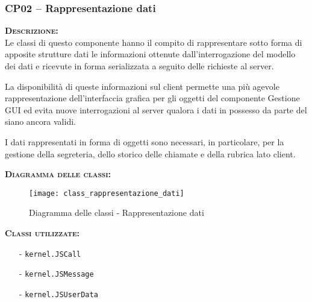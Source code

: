 \subsubsection{CP02 -- Rappresentazione dati}
\begin{description}
  \item{\scshape\bfseries Descrizione:}\\
Le classi di questo componente hanno il compito di rappresentare sotto forma di apposite strutture dati le informazioni ottenute dall'interrogazione del modello dei dati e ricevute in forma serializzata a seguito delle richieste al server.

La disponibilità di queste informazioni sul client permette una più agevole rappresentazione dell'interfaccia grafica per gli oggetti del componente \textsf{Gestione GUI} ed evita nuove interrogazioni al server qualora i dati in possesso da parte del  siano ancora validi.

I dati rappresentati in forma di oggetti sono necessari, in particolare, per la gestione della segreteria, dello storico delle chiamate e della rubrica lato client.

  \item{\scshape\bfseries Diagramma delle classi:}\\
  \begin{figure}[H]
    \centering
    \texttt{[image: class\_rappresentazione\_dati]}
    \caption{Diagramma delle classi - Rappresentazione dati}\label{fig:rappresentazionedati}
  \end{figure}

	\item{\scshape\bfseries Classi utilizzate:} 
	\begin{itemize}[noitemsep,nolistsep]
		\item[-] \texttt{kernel.JSCall}
		\item[-] \texttt{kernel.JSMessage}
		\item[-] \texttt{kernel.JSUserData}
	\end{itemize}  
\end{description}

